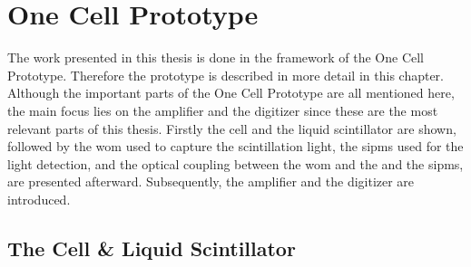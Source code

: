 \chapter{One Cell Prototype}

The work presented in this thesis is done in the framework of the One Cell Prototype.
Therefore the prototype is described in more detail in this chapter.
Although the important parts of the One Cell Prototype are all mentioned here, the main focus lies on the amplifier and the digitizer since these are the most relevant parts of this thesis.
Firstly the cell and the liquid scintillator are shown, followed by the \ac{wom} used to capture the scintillation light, the \acp{sipm} used for the light detection, and the optical coupling between the \ac{wom} and the and the \acp{sipm}, are presented afterward.
Subsequently, the amplifier and the digitizer are introduced.



\section{The Cell \& Liquid Scintillator}

